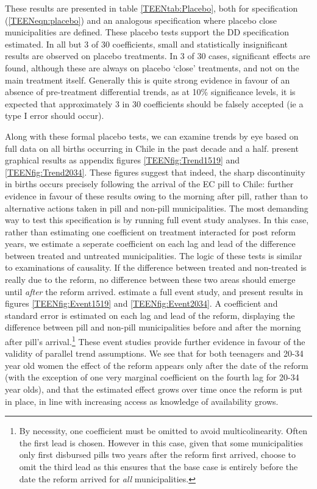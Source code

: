 These results are presented in table \ref{TEENtab:Placebo}, both for 
specification (\ref{TEENeqn:placebo}) and an analogous specification where 
placebo close municipalities are defined.  These placebo tests support the 
DD specification estimated.  In all but 3 of 30 coefficients, small
and statistically insignificant results are observed on placebo treatments.  In
3 of 30 cases, significant effects are found, although these are always on 
placebo `close' treatments, and not on the main treatment itself.  Generally
this is quite strong evidence in favour of an absence of pre-treatment 
differential trends, as at 10\% significance levels, it is expected that 
approximately 3 in 30 coefficients should be falsely accepted (ie a type I error
should occur).

Along with these formal placebo tests, we can examine trends by eye based on
full data on all births occurring in Chile in the past decade and a half. \Person 
present graphical results as appendix figures \ref{TEENfig:Trend1519} and 
\ref{TEENfig:Trend2034}.  These figures suggest that indeed, the sharp 
discontinuity in births occurs precisely following the arrival of the EC pill 
to Chile: further evidence in favour of these results owing to the morning after 
pill, rather than to alternative actions taken in pill and non-pill 
municipalities.  The most demanding way to test this specification is by
running full event study analyses.  In this case, rather than estimating one
coefficient on treatment interacted for post reform years, we estimate a 
seperate coefficient on each lag and lead of the difference between treated and
untreated municipalities. The logic of these tests is similar to examinations of
\citet{Granger1969} causality. If the difference between treated and non-treated
is really due to the reform, no difference between these two areas should emerge
until \emph{after} the reform arrived.  \Person estimate a full event study, and
present results in figures \ref{TEENfig:Event1519} and \ref{TEENfig:Event2034}.
A coefficient and standard error is estimated on each lag and lead of the reform, 
displaying the difference between pill and non-pill municipalities before and
after the morning after pill's arrival.\footnote{By necessity, one coefficient
must be omitted to avoid multicolinearity.  Often the first lead is chosen.  
However in this case, given that some municipalities only first disbursed pills
two years after the reform first arrived, \person choose to omit the third lead
as this ensures that the base case is entirely before the date the reform 
arrived for \emph{all} municipalities.}  These event studies provide further
evidence in favour of the validity of parallel trend assumptions.  We see that
for both teenagers and 20-34 year old women the effect of the reform appears
only after the date of the reform (with the exception of one very marginal 
coefficient on the fourth lag for 20-34 year olds), and that the estimated 
effect grows over time once the reform is put in place, in line with increasing
access as knowledge of availability grows.


